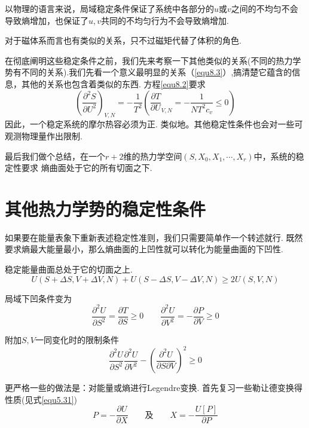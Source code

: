 以物理的语言来说，局域稳定条件保证了系统中各部分的$u\text{或}v$之间的不均匀不会导致熵增加，也保证了$u,v$共同的不均匀行为不会导致熵增加.

对于磁体系而言也有类似的关系，只不过磁矩代替了体积的角色.

在彻底阐明这些稳定条件之前，我们先来考察一下其他类似的关系(不同的热力学势有不同的关系).我们先看一个意义最明显的关系（\ref{equ8.3}）,搞清楚它蕴含的信息，其他的关系也包含着类似的东西. 方程\ref{equ8.2}要求
\begin{equation}
\label{equ8.7}
\left(\frac{\partial^2S}{\partial U^2}\right)_{V,N}=-\frac{1}{T^2}\left(\frac{\partial T}{\partial U}_{V,N}=-\frac{1}{NT^2c_v}\leq 0\right)
\end{equation} 
因此，一个稳定系统的摩尔热容必须为正. 类似地。其他稳定性条件也会对一些可观测物理量作出限制.

最后我们做个总结，在一个$r+2$维的热力学空间$(S,X_0,X_1,\cdots,X_r)$中，系统的稳定性要求
熵曲面处于它的所有切面之下.





\section{其他热力学势的稳定性条件}
\label{sec3.2}
如果要在能量表象下重新表述稳定性准则，我们只需要简单作一个转述就行. 既然要求熵最大能量最小，那么熵曲面的上凹性就可以转化为能量曲面的下凹性.

稳定能量曲面总处于它的切面之上.
\begin{equation}
\label{equ8.8}
U(S+\Delta S,V+\Delta V,N)+U(S-\Delta S,V-\Delta V,N)\geq 2U(S,V,N)
\end{equation}

局域下凹条件变为
\begin{equation}
\label{equ8.9}
\frac{\partial^2U}{\partial S^2}=\frac{\partial T}{\partial S}\geq 0\qquad \frac{\partial^2U}{\partial V^2}=-\frac{\partial P}{\partial V}\geq 0
\end{equation}

附加$S,V$一同变化时的限制条件
\begin{equation}
\label{equ8.10}
\frac{\partial^2U}{\partial S^2}\frac{\partial^2U}{\partial V^2}-\left(\frac{\partial^2U}{\partial S\partial V}\right)^2\geq 0
\end{equation}

更严格一些的做法是：对能量或熵进行Legendre变换. 首先复习一些勒让德变换得性质(见式\ref{equ5.31})
\begin{equation}
\label{equ8.11}
P=-\frac{\partial U}{\partial X}\qquad\text{及}\qquad X=-\frac{U[P]}{\partial P}
\end{equation}

